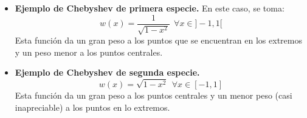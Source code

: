 \begin{itemize}
    \item \textbf{Ejemplo de Chebyshev de primera especie.}
En este caso, se toma:
$$w(x) = \dfrac{1}{\sqrt{1-x^2}}~~\forall x \in ]-1,1[$$
Esta función da un gran peso a los puntos que se encuentran en los extremos y un peso menor a los puntos centrales.

        \begin{figure}[H]
            \centering
        \end{figure}

    \item \textbf{Ejemplo de Chebyshev de segunda especie.}
$$w(x) = \sqrt{1-x^2}~~\forall x \in [-1,1]$$
Esta función da un gran peso a los puntos centrales y un menor peso (casi inapreciable) a los puntos en lo extremos.
        \begin{figure}[H]
            \centering
        \end{figure}
\end{itemize}


